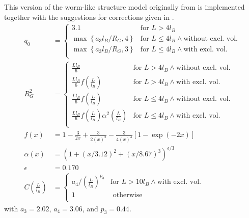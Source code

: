This version of the worm-like structure model originally from \cite{Pedersen96Macrom} is implemented together with the suggestions for corrections given in \cite{Chen2006}.
\begin{align}
q_0 &=
\begin{cases}
3.1 & \mbox{for~} L>4l_B \\
\max\left\{a_3 l_B/R_G,4\right\} & \mbox{for~} L\leq 4l_B \wedge \mbox{without excl. vol.}\\
\max\left\{a_3 l_B/R_G,3\right\} & \mbox{for~} L\leq 4l_B \wedge \mbox{with excl. vol.}\\
\end{cases}\\
R_G^2 &=
\begin{cases}
\frac{Ll_B}{6} & \mbox{for~} L > 4l_B \wedge \mbox{without excl. vol.} \\
\frac{Ll_B}{6} f\left(\frac{L}{l_B}\right) & \mbox{for~} L > 4l_B \wedge \mbox{with excl. vol.} \\
\frac{Ll_B}{6} f\left(\frac{L}{l_B}\right)& \mbox{for~} L\leq 4l_B \wedge \mbox{without excl. vol.}\\
\frac{Ll_B}{6} f\left(\frac{L}{l_B}\right)\alpha^2\left(\frac{L}{l_B}\right) & \mbox{for~} L\leq 4l_B \wedge \mbox{with excl. vol.}\\
\end{cases} \\
f(x) &= 1-\frac{3}{2x}+\frac{3}{2\left(x\right)^2}-\frac{3}{4\left(x\right)^3}\left[1-\exp\left(-2x\right)\right]\\
\alpha(x) &= \left(1+(x/3.12)^2+(x/8.67)^3\right)^{\epsilon/3} \\
\epsilon&=0.170 \\
C\left(\frac{L}{l_B}\right) &=
\begin{cases}
a_4/\left(\frac{L}{l_B}\right)^{p_3} & \mbox{for~} L > 10l_B \wedge \mbox{with excl. vol.} \\
1 & \mbox{ otherwise}\\
\end{cases}
\end{align}
with  $a_3=2.02$, $a_4=3.06$, and $p_3=0.44$.
